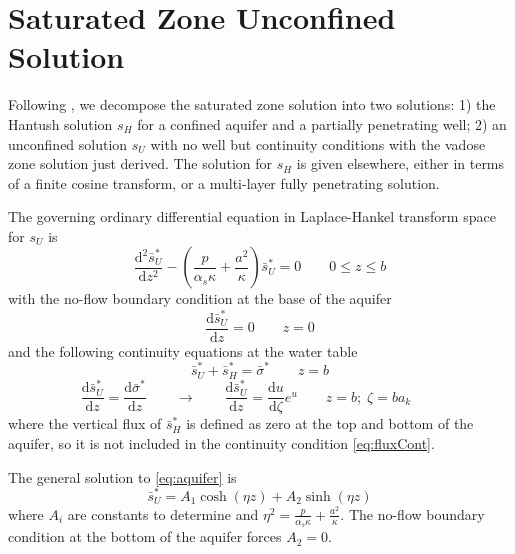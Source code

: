 \documentclass[11pt]{article}
\begin{document}
\section{Saturated Zone Unconfined Solution}
Following \cite{mishra10}, we decompose the saturated zone solution into two solutions: 1) the Hantush solution $s_H$ for a confined aquifer and a partially penetrating well; 2) an unconfined solution $s_U$ with no well but continuity conditions with the vadose zone solution just derived.  The solution for $s_H$ is given elsewhere, either in terms of a finite cosine transform, or a multi-layer fully penetrating solution.  

The governing ordinary differential equation in Laplace-Hankel transform space for $s_U$ is
\begin{equation}
  \label{eq:aquifer}
  \frac{\mathrm{d}^2 \bar{s}_U^{\ast}}{\mathrm{d} z^2} - \left( \frac{p}{\alpha_s \kappa} + \frac{a^2}{\kappa} \right)\bar{s}_U^{\ast} = 0 \qquad 0 \le z \le b
\end{equation}
with the no-flow boundary condition at the base of the aquifer
$$ \frac{\mathrm{d} \bar{s}_U^{\ast}}{\mathrm{d} z} = 0 \qquad z=0 $$
and the following continuity equations at the water table
\begin{equation}
  \label{eq:headCont}
  \bar{s}_U^{\ast} + \bar{s}_H^{\ast} = \bar{\sigma}^{\ast} \qquad z=b
\end{equation}
\begin{equation}
  \label{eq:fluxCont}
  \frac{\mathrm{d} \bar{s}_U^{\ast}}{\mathrm{d} z}  = \frac{\mathrm{d}
    \bar{\sigma}^{\ast}}{\mathrm{d} z} \qquad \rightarrow \qquad \frac{\mathrm{d} \bar{s}_U^{\ast}}{\mathrm{d} z}  = \frac{\mathrm{d}u}{\mathrm{d} \zeta} e^u \qquad z=b; \; \zeta=b a_k
  \qquad 
\end{equation}
where the vertical flux of $\bar{s}_H^{\ast}$ is defined as zero at
the top and bottom of the aquifer, so it is not included in the
continuity condition \eqref{eq:fluxCont}.

The general solution to \eqref{eq:aquifer} is 
\begin{equation}
  \label{eq:su}
  \bar{s}_U^{\ast} = A_1 \cosh(\eta z) + A_2 \sinh(\eta z)
\end{equation}
where $A_i$ are constants to determine and $\eta^2 = \frac{p}{\alpha_s \kappa} + \frac{a^2}{\kappa}$.  The no-flow boundary condition at the bottom of the aquifer forces $A_2=0$.  
\end{document}
